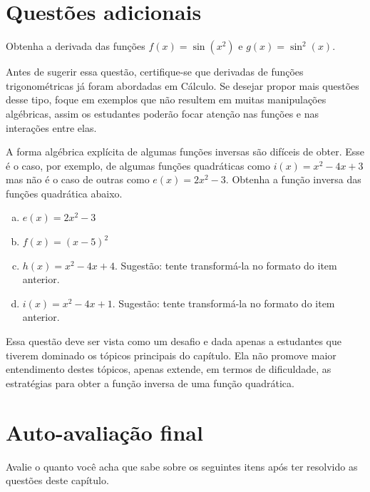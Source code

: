 \documentclass[main.tex]{subfiles}
\begin{document}
\imprimeGabarito

\paraTutores

\section{Questões adicionais}

\begin{adicional}
Obtenha a derivada das funções $f(x)=\sin(x^2)$ e $g(x)=\sin^2(x)$.
\end{adicional}

Antes de sugerir essa questão, certifique-se que derivadas de funções trigonométricas já foram abordadas em Cálculo. Se desejar propor mais questões desse tipo, foque em exemplos que não resultem em muitas manipulações algébricas, assim os estudantes poderão focar atenção nas funções e nas interações entre elas.

\begin{adicional}
A forma algébrica explícita de algumas funções inversas são difíceis de obter. Esse é o caso, por exemplo, de algumas funções quadráticas como $i(x)=x^2-4x+3$ mas não é o caso de outras como $e(x)=2x^2-3$. Obtenha a função inversa das funções quadrática abaixo.
\begin{enumerate}[a)]
\item $e(x)=2x^2-3$
\item $f(x)=(x-5)^2$
\item $h(x)=x^2-4x+4$. Sugestão: tente transformá-la no formato do item anterior.
\item $i(x)=x^2-4x+1$. Sugestão: tente transformá-la no formato do item anterior.
\end{enumerate}
\end{adicional}

Essa questão deve ser vista como um desafio e dada apenas a estudantes que tiverem dominado os tópicos principais do capítulo. Ela não promove maior entendimento destes tópicos, apenas extende, em termos de dificuldade, as estratégias para obter a função inversa de uma função quadrática.

\paraAlunos

\section{Auto-avaliação final}
Avalie o quanto você acha que sabe sobre os seguintes itens após ter resolvido as questões deste capítulo.
\end{document}
